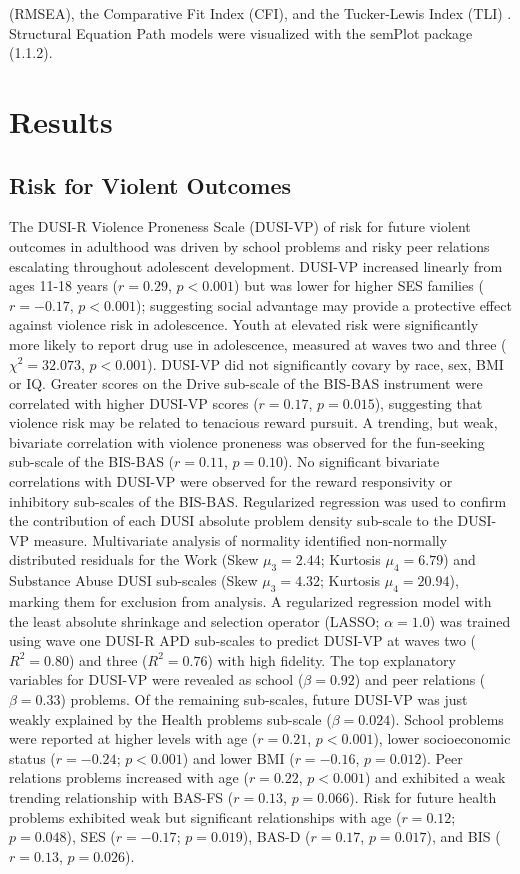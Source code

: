 \documentclass[utf8]{article}
\begin{document}
(RMSEA), the Comparative Fit Index (CFI), and the Tucker-Lewis Index (TLI) \citep{KennyEtAl2015,HuTzeBentler1999, wu2009evaluating}. Structural Equation Path models were visualized with the semPlot package (1.1.2). 

\section{Results} 
\subsection{Risk for Violent Outcomes} The DUSI-R Violence Proneness Scale (DUSI-VP) of risk for future violent outcomes in adulthood was driven by school problems and risky peer relations escalating throughout adolescent development. DUSI-VP increased linearly from ages 11-18 years ($r=0.29$,  $p<0.001$) but was lower for higher SES families ($r=-0.17$, $p<0.001$); suggesting social advantage may provide a protective effect against violence risk in adolescence. Youth at elevated risk were significantly more likely to report drug use in adolescence, measured at waves two and three ($\chi^2 = 32.073$, $p<0.001$). DUSI-VP did not significantly covary by race, sex, BMI or IQ. Greater scores on the Drive sub-scale of the BIS-BAS instrument were correlated with higher DUSI-VP scores ($r=0.17$, $p=0.015$), suggesting that violence risk may be related to tenacious reward pursuit. A trending, but weak, bivariate correlation with violence proneness was observed for the fun-seeking sub-scale of the BIS-BAS ($r=0.11$, $p=0.10$). No significant bivariate correlations with DUSI-VP were observed for the reward responsivity or inhibitory sub-scales of the BIS-BAS. Regularized regression was used to confirm the contribution of each DUSI absolute problem density sub-scale to the DUSI-VP measure. Multivariate analysis of normality identified non-normally distributed residuals for the Work (Skew $\mu_3=2.44$; Kurtosis $\mu_4=6.79$) and Substance Abuse DUSI sub-scales (Skew $\mu_3=4.32$; Kurtosis $\mu_4=20.94$), marking them for exclusion from analysis. A regularized regression model with the least absolute shrinkage and selection operator (LASSO; $\alpha=1.0$) was trained using wave one DUSI-R APD sub-scales to predict DUSI-VP at waves two ($R^2=0.80$) and three ($R^2=0.76$) with high fidelity. The top explanatory variables for DUSI-VP were revealed as school ($\beta=0.92$) and peer relations ($\beta=0.33$) problems. Of the remaining sub-scales, future DUSI-VP was just weakly explained by the Health problems sub-scale ($\beta=0.024$). School problems were reported at higher levels with age ($r=0.21$, $p<0.001$), lower socioeconomic status ($r=-0.24$; $p<0.001$) and lower BMI ($r=-0.16$, $p=0.012$). Peer relations problems increased with age ($r=0.22$, $p<0.001$) and exhibited a weak trending relationship with BAS-FS ($r=0.13$, $p=0.066$). Risk for future health problems exhibited weak but significant relationships with age ($r=0.12$; $p=0.048$), SES ($r=-0.17$; $p=0.019$), BAS-D ($r=0.17$, $p=0.017$), and BIS ($r=0.13$, $p=0.026$). 
%
\vspace{20pt}
\end{document}
